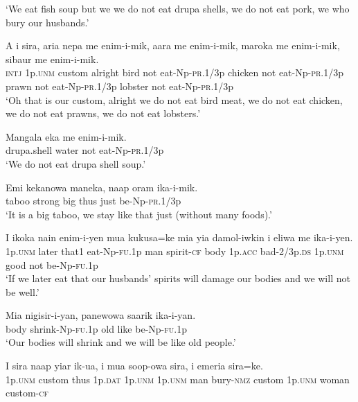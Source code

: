 \glt ‘We eat fish soup but we we do not eat drupa shells, we do not eat pork, we who bury our husbands.’ \\
\z


\ea
\gll  A  i  sira,  aria  nepa  me  enim-i-mik,  aara              me  enim-i-mik,  maroka  me  enim-i-mik,  sibaur         me  enim-i-mik. \\
\textsc{intj}  1p.\textsc{unm}  custom  alright  bird  not  eat-Np-\textsc{pr}.1/3p  chicken not  eat-Np-\textsc{pr}.1/3p  prawn  not  eat-Np-\textsc{pr}.1/3p  lobster not  eat-Np-\textsc{pr}.1/3p \\




\glt ‘Oh that is our custom, alright we do not eat bird meat, we do not eat chicken, we do not eat prawns, we do not eat lobsters.’ \\
\z


\ea
\gll  Mangala  eka  me  enim-i-mik. \\
drupa.shell  water  not  eat-Np-\textsc{pr}.1/3p \\
\glt ‘We do not eat drupa shell soup.’ \\
\z


\ea
\gll  Emi  kekanowa  maneka,  naap  oram  ika-i-mik. \\
taboo  strong  big  thus  just  be-Np-\textsc{pr}.1/3p \\
\glt ‘It is a big taboo, we stay like that just (without many foods).’ \\
\z


\ea
\gll  I  ikoka  nain  enim-i-yen  mua  kukusa=ke  mia  yia       damol-iwkin  i  eliwa  me  ika-i-yen. \\
1p.\textsc{unm}  later  that1  eat-Np-\textsc{fu}.1p  man  spirit-\textsc{cf}  body  1p.\textsc{acc} bad-2/3p.\textsc{ds}  1p.\textsc{unm}  good  not  be-Np-\textsc{fu}.1p \\


\glt ‘If we later eat that our husbands’ spirits will damage our bodies and we will not be well.’ \\
\z


\ea
\gll  Mia  nigisir-i-yan,  panewowa  saarik  ika-i-yan. \\
body  shrink-Np-\textsc{fu}.1p  old  like  be-Np-\textsc{fu}.1p \\
\glt ‘Our bodies will shrink and we will be like old people.’ \\
\z


\ea
\gll  I  sira  naap  yiar  ik-ua,  i  mua  soop-owa  sira,          i  emeria  sira=ke. \\
1p.\textsc{unm}  custom  thus  1p.\textsc{dat}  1p.\textsc{unm}  1p.\textsc{unm}  man  bury-\textsc{nmz}  custom 1p.\textsc{unm}  woman  custom-\textsc{cf} \\


